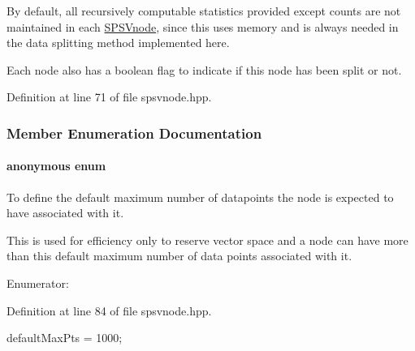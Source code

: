 \-By default, all recursively computable statistics provided except counts are not maintained in each \hyperlink{classsubpavings_1_1SPSVnode}{\-S\-P\-S\-Vnode}, since this uses memory and is always needed in the data splitting method implemented here.

\-Each node also has a boolean flag to indicate if this node has been split or not. 

\-Definition at line 71 of file spsvnode.\-hpp.



\subsubsection{\-Member \-Enumeration \-Documentation}
\hypertarget{classsubpavings_1_1SPSVnode_ae284ba2007e19bf4e2d546d6d844346a}{\paragraph[{anonymous enum}]{\setlength{\rightskip}{0pt plus 5cm}anonymous enum}}\label{classsubpavings_1_1SPSVnode_ae284ba2007e19bf4e2d546d6d844346a}


\-To define the default maximum number of datapoints the node is expected to have associated with it. 

\-This is used for efficiency only to reserve vector space and a node can have more than this default maximum number of data points associated with it. \begin{Desc}
\item[\-Enumerator\-: ]\par
\begin{description}
\item[{\em 
\hypertarget{classsubpavings_1_1SPSVnode_ae284ba2007e19bf4e2d546d6d844346aa0a41030519d8a235798dcc07a0c2948c}{default\-Max\-Pts}\label{classsubpavings_1_1SPSVnode_ae284ba2007e19bf4e2d546d6d844346aa0a41030519d8a235798dcc07a0c2948c}
}]\end{description}
\end{Desc}



\-Definition at line 84 of file spsvnode.\-hpp.


\begin{DoxyCode}
{defaultMaxPts = 1000};
\end{DoxyCode}


